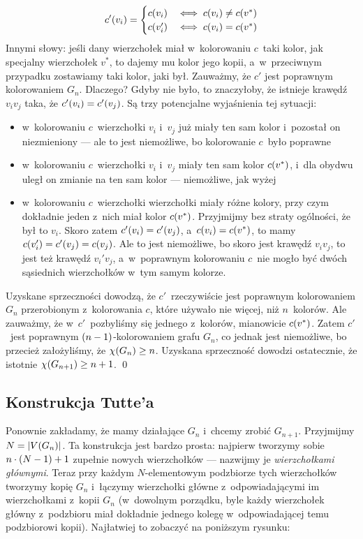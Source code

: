 \begin{itemize}
\begin{equation*}
		      c'\pars{v_i} = \begin{cases}
			      c\pars{v_i}  & \iff c\pars{v_i} \neq c\pars{v^\ast} \\
			      c\pars{v_i'} & \iff c\pars{v_i} = c\pars{v^\ast}
		      \end{cases}
	      \end{equation*}
	      Innymi słowy: jeśli dany wierzchołek miał w~kolorowaniu \(c\)~taki kolor, jak specjalny wierzchołek \(v^\ast\), to dajemy mu kolor jego kopii, a~w~przeciwnym przypadku zostawiamy taki kolor, jaki był. Zauważmy, że \(c'\) jest poprawnym kolorowaniem \(G_n\). Dlaczego? Gdyby nie było, to znaczyłoby, że istnieje krawędź \(v_iv_j\) taka, że \(c'\pars{v_i} = c'\pars{v_j}\). Są trzy potencjalne wyjaśnienia tej sytuacji:
	      \begin{itemize}
		      \item w~kolorowaniu \(c\)~wierzchołki \(v_i\) i~\(v_j\) już miały ten sam kolor i~pozostał on niezmieniony --- ale to jest niemożliwe, bo kolorowanie \(c\)~było poprawne
		      \item w~kolorowaniu \(c\)~wierzchołki \(v_i\) i~\(v_j\) miały ten sam kolor \(c\pars{v^\ast}\), i~dla obydwu uległ on zmianie na ten sam kolor --- niemożliwe, jak wyżej
		      \item w~kolorowaniu \(c\)~wierzchołki wierzchołki miały różne kolory, przy czym dokładnie jeden z~nich miał kolor \(c\pars{v^\ast}\). Przyjmijmy bez straty ogólności, że był to \(v_i\). Skoro zatem \(c'\pars{v_i} = c'\pars{v_j}\), a~\(c\pars{v_i} = c\pars{v^\ast}\), to mamy \(c\pars{v_i'} = c'\pars{v_j} = c\pars{v_j}\). Ale to jest niemożliwe, bo skoro jest krawędź \(v_iv_j\), to jest też krawędź \(v_i'v_j\), a~w~poprawnym kolorowaniu \(c\)~nie mogło być dwóch sąsiednich wierzchołków w~tym samym kolorze.
	      \end{itemize}
	      Uzyskane sprzeczności dowodzą, że \(c'\)~rzeczywiście jest poprawnym kolorowaniem \(G_n\) przerobionym z~kolorowania \(c\), które używało nie więcej, niż \(n\)~kolorów. Ale zauważmy, że w~\(c'\)~pozbyliśmy się  jednego z~kolorów, mianowicie \(c\pars{v^\ast}\). Zatem \(c'\)~jest poprawnym \(\left(n - 1\right)\)-kolorowaniem grafu \(G_n\), co jednak jest niemożliwe, bo przecież założyliśmy, że \(\chi\pars{G_n} \geq n\). Uzyskana sprzeczność dowodzi ostatecznie, że istotnie \(\chi\pars{G_{n + 1}} \geq n + 1\).
	      \qed
\end{itemize}
\subsection{Konstrukcja Tutte'a}
Ponownie zakładamy, że mamy działające \(G_n\) i~chcemy zrobić \(G_{n + 1}\). Przyjmijmy \(N = \left|V\pars{G_n}\right|\). Ta konstrukcja jest bardzo prosta: najpierw tworzymy sobie \(n \cdot \left(N - 1\right) + 1\) zupełnie nowych wierzchołków --- nazwijmy je \emph{wierzchołkami głównymi}. Teraz przy każdym \(N\)-elementowym podzbiorze tych wierzchołków tworzymy kopię \(G_n\) i~łączymy wierzchołki główne z~odpowiadającymi im wierzchołkami z~kopii \(G_n\) (w~dowolnym porządku, byle każdy wierzchołek główny z~podzbioru miał dokładnie jednego kolegę w~odpowiadającej temu podzbiorowi kopii). Najłatwiej to zobaczyć na poniższym rysunku:

